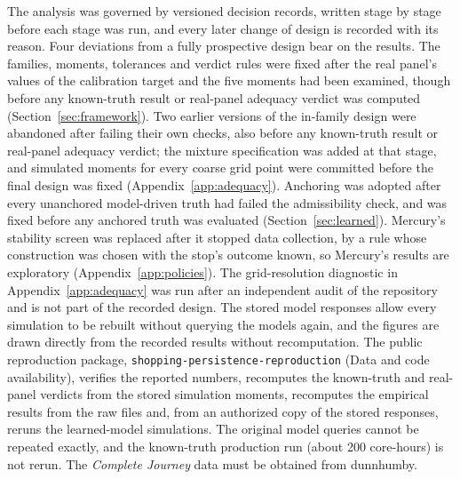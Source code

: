 \documentclass[11pt]{article}
\begin{document}
The analysis was governed by versioned decision records, written stage by stage before each
stage was run, and every later change of design is recorded with its reason. Four deviations from
a fully prospective design bear on the results. The families, moments, tolerances and verdict
rules were fixed after the real panel's values of the calibration target and the five moments had
been examined, though before any known-truth result or real-panel adequacy verdict was computed
(Section~\ref{sec:framework}). Two earlier versions of the in-family design were abandoned after
failing their own checks, also before any known-truth result or real-panel adequacy verdict;
the mixture specification was added at that stage, and simulated moments for every coarse grid
point were committed before the final design was fixed (Appendix~\ref{app:adequacy}). Anchoring was adopted after every unanchored model-driven truth
had failed the admissibility check, and was fixed before any anchored truth was evaluated
(Section~\ref{sec:learned}). Mercury's stability screen was replaced after it stopped data
collection, by a rule whose construction was chosen with the stop's outcome known, so Mercury's
results are exploratory (Appendix~\ref{app:policies}). The grid-resolution diagnostic in
Appendix~\ref{app:adequacy} was run after an independent audit of the repository and is not part
of the recorded design. The stored model responses allow
every simulation to be rebuilt without querying the models again, and the figures are drawn
directly from the recorded results without recomputation. The public reproduction package,
\texttt{shopping-persistence-reproduction} (Data and code availability), verifies the reported numbers, recomputes the known-truth and real-panel verdicts
from the stored simulation moments, recomputes the empirical results from the raw files and,
from an authorized copy of the stored responses, reruns the learned-model simulations. The
original model queries cannot be repeated exactly, and the known-truth production run (about 200
core-hours) is not rerun. The \emph{Complete Journey} data must be obtained from dunnhumby.
\end{document}
